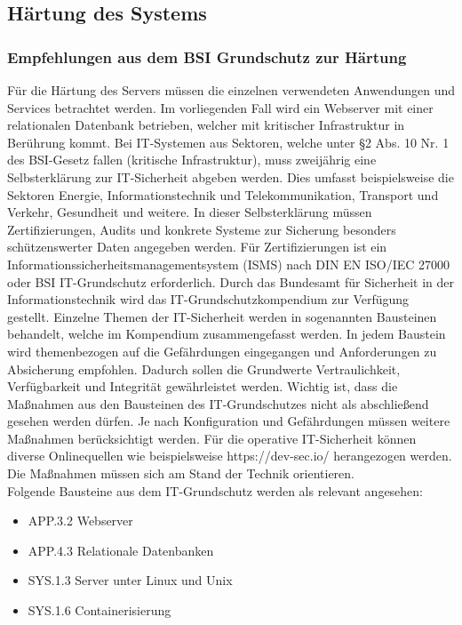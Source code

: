 \newpage
\subsection{Härtung des Systems}\label{kap:haertung_des_systems}


\subsubsection{Empfehlungen aus dem BSI Grundschutz zur Härtung}

F\"ur die H\"artung des Servers m\"ussen die einzelnen verwendeten Anwendungen und Services betrachtet werden. Im vorliegenden Fall wird ein Webserver mit einer relationalen Datenbank betrieben, welcher mit kritischer Infrastruktur in Ber\"uhrung kommt. Bei IT-Systemen aus Sektoren, welche unter \S2 Abs. 10 Nr. 1 des BSI-Gesetz fallen (kritische Infrastruktur), muss zweij\"ahrig eine Selbsterkl\"arung zur IT-Sicherheit abgeben werden. Dies umfasst beispielsweise die Sektoren Energie, Informationstechnik und Telekommunikation, Transport und Verkehr, Gesundheit und weitere. In dieser Selbsterkl\"arung m\"ussen Zertifizierungen, Audits und konkrete Systeme zur Sicherung besonders sch\"utzenswerter Daten angegeben werden. F\"ur Zertifizierungen ist ein Informationssicherheitsmanagementsystem (ISMS) nach DIN EN ISO/IEC 27000 oder BSI IT-Grundschutz erforderlich. Durch das Bundesamt f\"ur Sicherheit in der Informationstechnik wird das IT-Grundschutzkompendium zur Verf\"ugung gestellt.  Einzelne Themen der IT-Sicherheit werden in sogenannten Bausteinen behandelt, welche im Kompendium zusammengefasst werden. In jedem Baustein wird themenbezogen auf die Gef\"ahrdungen eingegangen und Anforderungen zu Absicherung empfohlen. Dadurch sollen die Grundwerte Vertraulichkeit, Verf\"ugbarkeit und Integrit\"at gew\"ahrleistet werden. Wichtig ist, dass die Ma{\ss}nahmen aus den Bausteinen des IT-Grundschutzes nicht als abschlie{\ss}end gesehen werden d\"urfen. Je nach Konfiguration und Gef\"ahrdungen m\"ussen weitere Ma{\ss}nahmen ber\"ucksichtigt werden. F\"ur die operative IT-Sicherheit k\"onnen diverse Onlinequellen wie beispielsweise https://dev-sec.io/ herangezogen werden. Die Ma{\ss}nahmen m\"ussen sich am Stand der Technik orientieren. \\

Folgende Bausteine aus dem IT-Grundschutz werden als relevant angesehen:
  \begin{itemize}
      \item APP.3.2 Webserver
			\item APP.4.3 Relationale Datenbanken
      \item SYS.1.3 Server unter Linux und Unix
			\item SYS.1.6 Containerisierung
   \end{itemize} 

